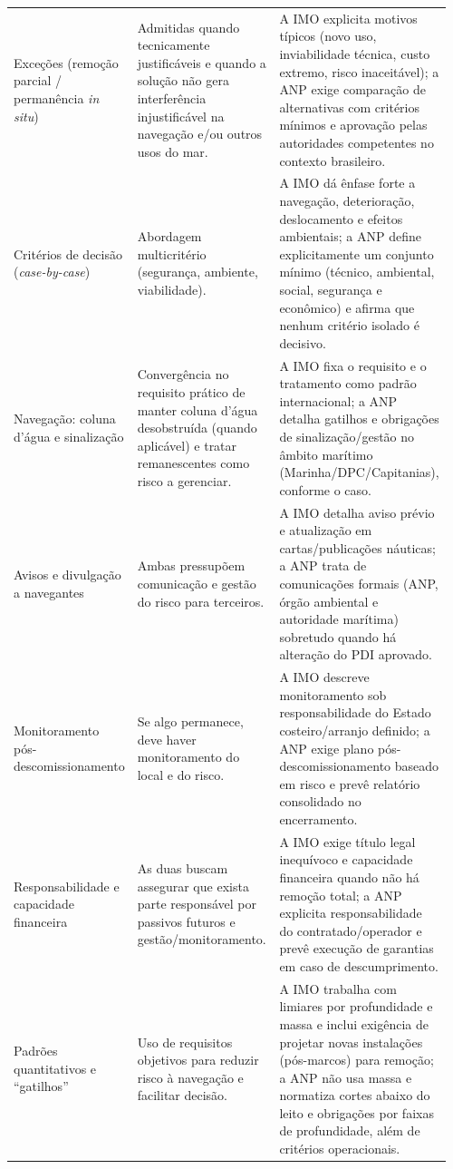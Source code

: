 \begin{landscape}
\begin{longtable}{@{}
  >{\RaggedRight\arraybackslash}p{0.14\linewidth}
  >{\RaggedRight\arraybackslash}p{0.41\linewidth}
  >{\RaggedRight\arraybackslash}p{0.41\linewidth}
@{}}
Exceções (remoção parcial / permanência \textit{in situ}) &
Admitidas quando tecnicamente justificáveis e quando a solução não gera interferência injustificável na navegação e/ou outros usos do mar. &
A IMO explicita motivos típicos (novo uso, inviabilidade técnica, custo extremo, risco inaceitável); a ANP exige comparação de alternativas com critérios mínimos e aprovação pelas autoridades competentes no contexto brasileiro. \\

Critérios de decisão (\textit{case-by-case}) &
Abordagem multicritério (segurança, ambiente, viabilidade). &
A IMO dá ênfase forte a navegação, deterioração, deslocamento e efeitos ambientais; a ANP define explicitamente um conjunto mínimo (técnico, ambiental, social, segurança e econômico) e afirma que nenhum critério isolado é decisivo. \\

Navegação: coluna d'água e sinalização &
Convergência no requisito prático de manter coluna d'água desobstruída (quando aplicável) e tratar remanescentes como risco a gerenciar. &
A IMO fixa o requisito e o tratamento como padrão internacional; a ANP detalha gatilhos e obrigações de sinalização/gestão no âmbito marítimo (Marinha/DPC/Capitanias), conforme o caso. \\

Avisos e divulgação a navegantes &
Ambas pressupõem comunicação e gestão do risco para terceiros. &
A IMO detalha aviso prévio e atualização em cartas/publicações náuticas; a ANP trata de comunicações formais (ANP, órgão ambiental e autoridade marítima) sobretudo quando há alteração do PDI aprovado. \\

Monitoramento pós-descomissionamento &
Se algo permanece, deve haver monitoramento do local e do risco. &
A IMO descreve monitoramento sob responsabilidade do Estado costeiro/arranjo definido; a ANP exige plano pós-descomissionamento baseado em risco e prevê relatório consolidado no encerramento. \\

Responsabilidade e capacidade financeira &
As duas buscam assegurar que exista parte responsável por passivos futuros e gestão/monitoramento. &
A IMO exige título legal inequívoco e capacidade financeira quando não há remoção total; a ANP explicita responsabilidade do contratado/operador e prevê execução de garantias em caso de descumprimento. \\

Padrões quantitativos e “gatilhos” &
Uso de requisitos objetivos para reduzir risco à navegação e facilitar decisão. &
A IMO trabalha com limiares por profundidade e massa e inclui exigência de projetar novas instalações (pós-marcos) para remoção; a ANP não usa massa e normatiza cortes abaixo do leito e obrigações por faixas de profundidade, além de critérios operacionais. \\


\end{longtable}
\end{landscape}
